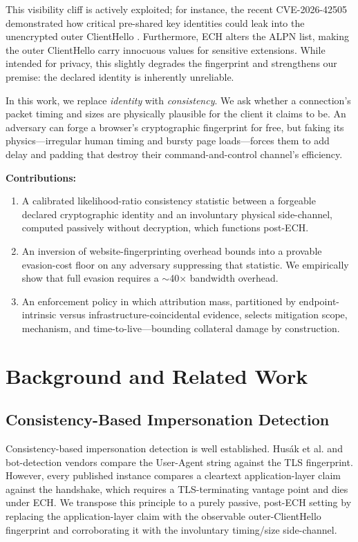 \documentclass[10pt, conference]{IEEEtran}
\begin{document}
This visibility cliff is actively exploited; for instance, the recent CVE-2026-42505 demonstrated how critical pre-shared key identities could leak into the unencrypted outer ClientHello \cite{cve202642505}. Furthermore, ECH alters the ALPN list, making the outer ClientHello carry innocuous values for sensitive extensions. While intended for privacy, this slightly degrades the fingerprint and strengthens our premise: the declared identity is inherently unreliable.

In this work, we replace \textit{identity} with \textit{consistency}. We ask whether a connection's packet timing and sizes are physically plausible for the client it claims to be. An adversary can forge a browser's cryptographic fingerprint for free, but faking its physics---irregular human timing and bursty page loads---forces them to add delay and padding that destroy their command-and-control channel's efficiency.

\textbf{Contributions:}
\begin{enumerate}
    \item A calibrated likelihood-ratio consistency statistic between a forgeable declared cryptographic identity and an involuntary physical side-channel, computed passively without decryption, which functions post-ECH.
    \item An inversion of website-fingerprinting overhead bounds into a provable evasion-cost floor on any adversary suppressing that statistic. We empirically show that full evasion requires a $\sim$40$\times$ bandwidth overhead.
    \item An enforcement policy in which attribution mass, partitioned by endpoint-intrinsic versus infrastructure-coincidental evidence, selects mitigation scope, mechanism, and time-to-live---bounding collateral damage by construction.
\end{enumerate}

\section{Background and Related Work}

\subsection{Consistency-Based Impersonation Detection}
Consistency-based impersonation detection is well established. Hus\'ak et al. \cite{husak2016} and bot-detection vendors \cite{botdetect2026} compare the User-Agent string against the TLS fingerprint. However, every published instance compares a cleartext application-layer claim against the handshake, which requires a TLS-terminating vantage point and dies under ECH. We transpose this principle to a purely passive, post-ECH setting by replacing the application-layer claim with the observable outer-ClientHello fingerprint and corroborating it with the involuntary timing/size side-channel.
\end{document}
